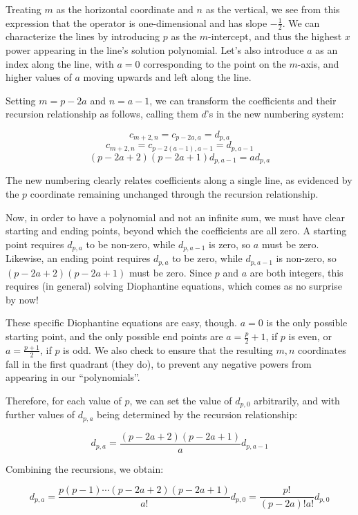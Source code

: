 \documentclass{article}
\begin{document}
Treating $m$ as the horizontal coordinate and $n$ as the vertical, we
see from this expression that the operator is one-dimensional and has
slope $-\frac{1}{2}$.  We can characterize the lines by introducing
$p$ as the $m$-intercept, and thus the highest $x$ power appearing in
the line's solution polynomial.  Let's also introduce $a$ as an index
along the line, with $a=0$ corresponding to the point on the $m$-axis,
and higher values of $a$ moving upwards and left along the line.

Setting $m=p-2a$ and $n=a-1$, we can transform the coefficients and
their recursion relationship as follows, calling them $d$'s in the new
numbering system:

$$c_{m+2,n} = c_{p-2a,a} = d_{p,a}$$
$$c_{m+2,n} = c_{p-2(a-1),a-1} = d_{p,a-1}$$
$$(p-2a+2)(p-2a+1) d_{p,a-1} = a d_{p,a}$$

The new numbering clearly relates coefficients along a single line, as
evidenced by the $p$ coordinate remaining unchanged through the
recursion relationship.

Now, in order to have a polynomial and not an infinite sum, we must
have clear starting and ending points, beyond which the coefficients
are all zero.  A starting point requires $d_{p,a}$ to be non-zero,
while $d_{p,a-1}$ is zero, so $a$ must be zero.  Likewise, an ending
point requires $d_{p,a}$ to be zero, while $d_{p,a-1}$ is non-zero,
so $(p-2a+2)(p-2a+1)$ must be zero.  Since $p$ and $a$ are both
integers, this requires (in general) solving Diophantine equations,
which comes as no surprise by now!

These specific Diophantine equations are easy, though.  $a=0$ is the
only possible starting point, and the only possible end points are
$a=\frac{p}{2}+1$, if $p$ is even, or $a=\frac{p+1}{2}$, if $p$ is
odd.  We also check to ensure that the resulting $m,n$ coordinates
fall in the first quadrant (they do), to prevent any negative powers
from appearing in our ``polynomials''.

Therefore, for each value of $p$, we can set the value of $d_{p,0}$
arbitrarily, and with further values of $d_{p,a}$ being determined
by the recursion relationship:

$$d_{p,a} = \frac{(p-2a+2)(p-2a+1)}{a} d_{p,a-1}$$

Combining the recursions, we obtain:

$$d_{p,a} = \frac{p(p-1)\cdots(p-2a+2)(p-2a+1)}{a!} d_{p,0} = \frac{p!}{(p-2a)!a!} d_{p,0}$$
\end{document}
